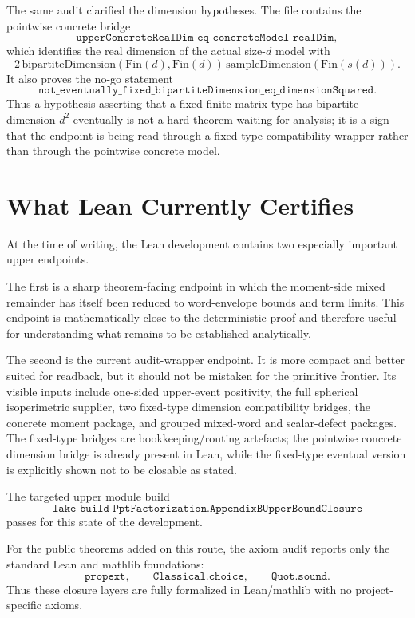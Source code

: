 \documentclass[11pt]{article}
\begin{document}
The same audit clarified the dimension hypotheses.  The file contains the
pointwise concrete bridge
\[
\texttt{upperConcreteRealDim\_eq\_concreteModel\_realDim},
\]
which identifies the real dimension of the actual size-\(d\) model with
\[
2\,\mathrm{bipartiteDimension}(\mathrm{Fin}(d),\mathrm{Fin}(d))\,
  \mathrm{sampleDimension}(\mathrm{Fin}(s(d))).
\]
It also proves the no-go statement
\[
\texttt{not\_eventually\_fixed\_bipartiteDimension\_eq\_dimensionSquared}.
\]
Thus a hypothesis asserting that a fixed finite matrix type has bipartite
dimension \(d^2\) eventually is not a hard theorem waiting for analysis; it is
a sign that the endpoint is being read through a fixed-type compatibility
wrapper rather than through the pointwise concrete model.

\section{What Lean Currently Certifies}

At the time of writing, the Lean development contains two especially important
upper endpoints.

The first is a sharp theorem-facing endpoint in which the moment-side mixed
remainder has itself been reduced to word-envelope bounds and term limits.
This endpoint is mathematically close to the deterministic proof and therefore
useful for understanding what remains to be established analytically.

The second is the current audit-wrapper endpoint.  It is more compact and
better suited for readback, but it should not be mistaken for the primitive
frontier.  Its visible inputs include one-sided upper-event positivity, the
full spherical isoperimetric supplier, two fixed-type dimension compatibility
bridges, the concrete moment package, and grouped mixed-word and scalar-defect
packages.  The fixed-type bridges are bookkeeping/routing artefacts; the
pointwise concrete dimension bridge is already present in Lean, while the
fixed-type eventual version is explicitly shown not to be closable as stated.

The targeted upper module build
\[
\texttt{lake build PptFactorization.AppendixBUpperBoundClosure}
\]
passes for this state of the development.

For the public theorems added on this route, the axiom audit reports only the
standard Lean and mathlib foundations:
\[
  \texttt{propext},\qquad
  \texttt{Classical.choice},\qquad
  \texttt{Quot.sound}.
\]
Thus these closure layers are fully formalized in Lean/mathlib with no
project-specific axioms.
\end{document}
